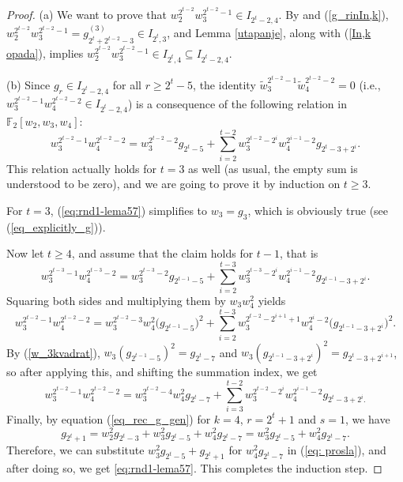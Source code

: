 \documentclass{amsart}
\theoremstyle{definition}
\theoremstyle{remark}
\numberwithin{equation}{section}
\newcommand{\F}{\mathbb F}
\newcommand{\w}{\widetilde w}
\renewcommand{\ge}{\geqslant}
\begin{document}
\begin{proof}
(a) We want to prove that $w_2^{2^{t-2}}w_3^{2^{t-2}-1}\in I_{2^t-2,4}$. By \cite[Proposition 2.2(c)]{CP-cl} and (\ref{g_rinIn,k}), $w_2^{2^{t-2}}w_3^{2^{t-2}-1}=g_{2^t+2^{t-2}-3}^{(3)}\in I_{2^t,3}$, and Lemma \ref{utapanje}, along with (\ref{In,k opada}), implies $w_2^{2^{t-2}}w_3^{2^{t-2}-1}\in I_{2^t,4}\subseteq I_{2^t-2,4}$.
  
    \medskip
    
 (b) Since $g_r\in I_{2^t-2,4}$ for all $r\ge2^t-5$, the identity $\w_3^{2^{t-2}-1}\w_4^{2^{t-2}-2}=0$ (i.e., $w_3^{2^{t-2}-1}w_4^{2^{t-2}-2}\in I_{2^t-2,4}$) is a consequence of the following relation in $\F_2[w_2,w_3,w_4]$: 
    \begin{equation}\label{eq:rnd1-lema57}
        w_3^{2^{t-2} - 1}w_4^{2^{t-2} - 2} = w_3^{2^{t-2} - 2}g_{2^t - 5} + \sum_{i = 2}^{t-2}w_3^{2^{t-2} - 2^i}w_4^{2^{i-1}-2}  g_{2^t -3 + 2^i}.
        \end{equation}
This relation actually holds for $t=3$ as well (as usual, the empty sum is understood to be zero), and we are going to prove it by induction on $t\ge3$. 

For $t=3$, (\ref{eq:rnd1-lema57}) simplifies to $w_3=g_3$, which is obviously true (see (\ref{eq_explicitly_g})).
    
Now let $t\ge4$, and assume that the claim holds for $t-1$, that is
    \[w_3^{2^{t-3} - 1}w_4^{2^{t-3} - 2} = w_3^{2^{t-3} - 2}g_{2^{t-1} - 5} + \sum_{i = 2}^{t-3}w_3^{2^{t-3} - 2^i}w_4^{2^{i-1}-2} g_{2^{t-1} -3 + 2^i}.\]
    Squaring both sides and multiplying them by $w_3w_4^2$ yields
    \[w_3^{2^{t-2} - 1}w_4^{2^{t-2} - 2} = w_3^{2^{t-2} - 3}w_4^2\big(g_{2^{t-1} - 5}\big)^2 + \sum_{i = 2}^{t-3}w_3^{2^{t-2} - 2^{i+1}+1}w_4^{2^{i}-2}\big(g_{2^{t-1} -3 + 2^i}\big)^2.\]
    By (\ref{w_3kvadrat}), $w_3(g_{2^{t-1}-5})^2 = g_{2^t -7}$ and $w_3(g_{2^{t-1} -3 + 2^i})^2 = g_{2^t-3 + 2^{i+1}}$, so after applying this, and shifting the summation index, we get
     \begin{equation}\label{eq: prosla}w_3^{2^{t-2} - 1}w_4^{2^{t-2} - 2} = w_3^{2^{t-2} - 4}w_4^2g_{2^t-7} + \sum_{i = 3}^{t-2}w_3^{2^{t-2} - 2^{i}}w_4^{2^{i-1}-2} g_{2^{t} -3 + 2^i.}
     \end{equation}
    Finally, by equation (\ref{eq_rec_g_gen}) for $k=4$, $r = 2^t+1$ and $s= 1$, we have
    \[g_{2^t +1} = w_2^2 g_{2^t-3} + w_3^2g_{2^t - 5} + w_4^2g_{2^t-7} = w_3^2g_{2^t - 5} + w_4^2g_{2^t-7}.\]
    Therefore, we can substitute $w_3^2g_{2^t - 5}+g_{2^t +1}$ for $w_4^2g_{2^t-7}$ in (\ref{eq: prosla}), and after doing so, we get \eqref{eq:rnd1-lema57}. This completes the induction step.


\end{proof}
\end{document}
